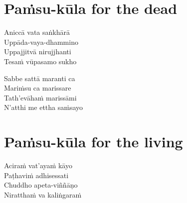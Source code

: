 \clearpage

\chapter{Paṁsu-kūla for the dead}%


\begin{paritta}
Aniccā vata saṅkhārā\\
Uppāda-vaya-dhammino\\
Uppajjitvā nirujjhanti\\
Tesaṁ vūpasamo sukho

Sabbe sattā maranti ca\\
Mariṁsu ca marissare\\
Tath'evāhaṁ marissāmi\\
N'atthi me ettha saṁsayo


\end{paritta}

\chapter{Paṁsu-kūla for the living}%


\begin{paritta}
Aciraṁ vat'ayaṁ kāyo\\
Paṭhaviṁ adhisessati\\
Chuddho apeta-viññāṇo\\
Niratthaṁ va kaliṅgaraṁ


\end{paritta}

